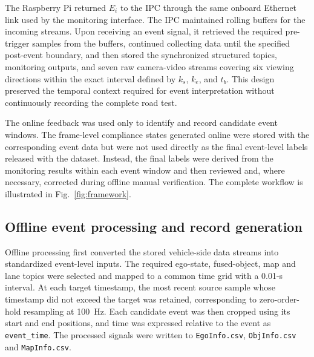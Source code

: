 \documentclass[pdflatex,sn-mathphys-num]{sn-jnl}
\begin{document}
The Raspberry Pi returned $E_i$ to the IPC through the same onboard Ethernet link used by the monitoring interface. The IPC maintained rolling buffers for the incoming streams. Upon receiving an event signal, it retrieved the required pre-trigger samples from the buffers, continued collecting data until the specified post-event boundary, and then stored the synchronized structured topics, monitoring outputs, and seven raw camera-video streams covering six viewing directions within the exact interval defined by $k_s$, $k_e$, and $t_b$. This design preserved the temporal context required for event interpretation without continuously recording the complete road test.

The online feedback was used only to identify and record candidate event windows. The frame-level compliance states generated online were stored with the corresponding event data but were not used directly as the final event-level labels released with the dataset. Instead, the final labels were derived from the monitoring results within each event window and then reviewed and, where necessary, corrected during offline manual verification. The complete workflow is illustrated in Fig.~\ref{fig:framework}.

\FloatBarrier

\subsection{Offline event processing and record generation}\label{subsec:offline-processing}

Offline processing first converted the stored vehicle-side data streams into standardized event-level inputs. The required ego-state, fused-object, map and lane topics were selected and mapped to a common time grid with a 0.01-s interval. At each target timestamp, the most recent source sample whose timestamp did not exceed the target was retained, corresponding to zero-order-hold resampling at 100~Hz. Each candidate event was then cropped using its start and end positions, and time was expressed relative to the event as \texttt{event\_time}. The processed signals were written to \texttt{EgoInfo.csv}, \texttt{ObjInfo.csv} and \texttt{MapInfo.csv}.
\end{document}
